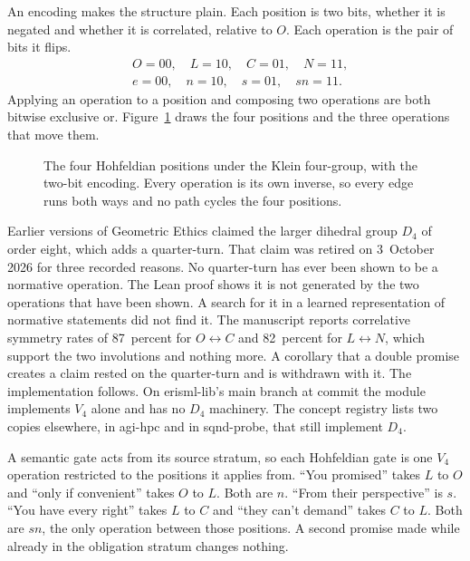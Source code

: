 An encoding makes the structure plain. Each position is two bits, whether it is negated and
whether it is correlated, relative to $O$. Each operation is the pair of bits it flips.
\begin{equation}
\begin{aligned}
&O=00,\quad L=10,\quad C=01,\quad N=11,\\
&e=00,\quad n=10,\quad s=01,\quad sn=11 .
\end{aligned}
\label{eq:ge-bits}
\end{equation}
Applying an operation to a position and composing two operations are both bitwise exclusive or.
Figure~\ref{fig:ge-v4} draws the four positions and the three operations that move them.

\begin{figure}[t]
\centering

\caption{The four Hohfeldian positions under the Klein four-group, with the two-bit encoding.
Every operation is its own inverse, so every edge runs both ways and no path cycles the four
positions.}
\label{fig:ge-v4}
\end{figure}

Earlier versions of Geometric Ethics claimed the larger dihedral group $D_4$ of order eight, which
adds a quarter-turn. That claim was retired on 3~October 2026 for three recorded reasons. No
quarter-turn has ever been shown to be a normative operation. The Lean proof shows it is not
generated by the two operations that have been shown. A search for it in a learned representation
of normative statements did not find it.
The manuscript reports correlative symmetry rates of 87~percent for $O\leftrightarrow C$ and
82~percent for $L\leftrightarrow N$, which support the two involutions and nothing more. A
corollary that a double promise creates a claim rested on the quarter-turn and is withdrawn with
it.
The implementation follows. On erisml-lib's main branch at commit  the module
 implements $V_4$ alone and has no $D_4$ machinery. The concept
registry lists two copies elsewhere, in agi-hpc and in sqnd-probe, that still implement $D_4$.

A semantic gate acts from its source stratum, so each Hohfeldian gate is one $V_4$ operation
restricted to the positions it applies from. ``You promised'' takes $L$ to $O$ and ``only if
convenient'' takes $O$ to $L$. Both are $n$. ``From their perspective'' is $s$. ``You have every
right'' takes $L$ to $C$ and ``they can't demand'' takes $C$ to $L$. Both are $sn$, the only
operation between those positions. A second promise made while already in the obligation stratum
changes nothing.

